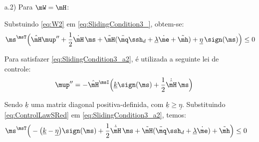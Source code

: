 \documentclass[]{politex}
\begin{document}
\begin{itemize}
\begin{itemize}
Portanto, se a seguinte inequa\c{c}\~ao matricial for respeitada:
\begin{equation} \label{eq:DesigualdadeK2_a1}
(\mone - | \mH^\msI \tilde{\mH}|_{max} ) \cdot \diag(\underline{k})  \geq \diag(\underline{\eta}) + |\mH^\msI \tilde{\mH}|_{max} |\ddot{\mq}\ssh_d + \underline{\lambda} \dot{\me}| + |\mH^\msI\tilde{\mh}|_{max}
\end{equation}

\eqref{eq:DesigualdadeK1} ser\'a respeitada, o que garante que a condi\c{c}\~ao de escorregamento \eqref{eq:SlidingCondition} tamb\'em seja respeitada e consequentemente garante a converg\^encia do erro de controle para zero.

Existe solu\c{c}\~ao para \eqref{eq:DesigualdadeK2_a1} apenas se a matriz $\mone - | \mH^\msI \tilde{\mH}|_{max}$ for uma \emph{M-matrix}, ou seja, se módulo do maior autovalor de $| \mH^\msI \tilde{\mH}|_{max}$ for menor que $1$. Se este for o caso, a solução que minimiza a norma de $\diag(\underline{k})$ é dada por:
\begin{equation} \label{eq:MatrizDiagk_a1}
\diag(\underline{k})  = (\mone - | \mH^\msI \tilde{\mH}|_{max} )^\msI (\diag(\underline{\eta}) + |\mH^\msI \tilde{\mH}|_{max} |\ddot{\mq}\ssh_d + \underline{\lambda} \dot{\me}| + |\mH^\msI\tilde{\mh}|_{max})
\end{equation}

\item[a.2)] Para $\mW = \mH$:


Substuindo \eqref{eq:W2} em \eqref{eq:SlidingCondition3_}, obtem-se:
\begin{equation} \label{eq:SlidingCondition3_a2}
\ms^\msT \Big(\hat{\mH}\mup'' + \frac{1}{2} \dot{\mH} \, \ms +  \tilde{\mH}(\ddot{\mq}\ssh_d + \underline{\lambda} \dot{\me} + \tilde{\mh} ) + \underline{\eta} \, \sign(\ms) \Big) \leq 0
\end{equation}

Para satisfazer \eqref{eq:SlidingCondition3_a2}, é utilizada a seguinte lei de controle:
\begin{equation} \label{eq:ControlLawSRed_a2}
\mup'' =  - \hat{\mH}^\msI \Big( \underline{k} \sign(\ms) +  \frac{1}{2} \dot{\hat{\mH}} \, \ms \Big) 
\end{equation}

Sendo $\underline{k}$ uma matriz diagonal positiva-definida, com $\underline{k} \geq \underline{\eta} $. Substituindo \eqref{eq:ControlLawSRed} em \eqref{eq:SlidingCondition3_a2}, temos:
\begin{equation} \label{eq:SlidingCondition4_a2}
\ms^\msT \Big(- \big(\underline{k} - \underline{\eta} \big)  \sign(\ms) + \frac{1}{2} \dot{\tilde{\mH}} \, \ms + \tilde{\mH}(\ddot{\mq}\ssh_d + \underline{\lambda} \dot{\me}) + \tilde{\mh}  \Big) \leq 0
\end{equation}


\end{itemize}
\end{itemize}
\end{document}
